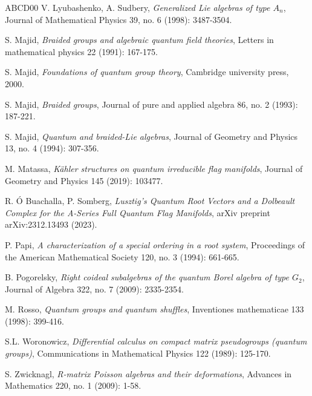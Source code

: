 \documentclass[a4paper, 12pt, reqno, english]{amsart}
\numberwithin{equation}{section}
\numberwithin{figure}{section}
\theoremstyle{plain}
\theoremstyle{plain}
\theoremstyle{plain}
\theoremstyle{plain}
\theoremstyle{plain}
\theoremstyle{definition}
\theoremstyle{definition}
\theoremstyle{definition}
\theoremstyle{remark}
\theoremstyle{definition}
\theoremstyle{definition}
\begin{document}
\begin{thebibliography}{ABCD00}
V. Lyubashenko, A. Sudbery,
\textit{Generalized Lie algebras of type $A_n$},
Journal of Mathematical Physics 39, no. 6 (1998): 3487-3504.

S. Majid,
\textit{Braided groups and algebraic quantum field theories},
Letters in mathematical physics 22 (1991): 167-175.

S. Majid,
\textit{Foundations of quantum group theory},
Cambridge university press, 2000.

S. Majid,
\textit{Braided groups},
Journal of pure and applied algebra 86, no. 2 (1993): 187-221.

S. Majid,
\textit{Quantum and braided-Lie algebras},
Journal of Geometry and Physics 13, no. 4 (1994): 307-356.

M. Matassa,
\textit{Kähler structures on quantum irreducible flag manifolds},
Journal of Geometry and Physics 145 (2019): 103477.

R. Ó Buachalla, P. Somberg,
\textit{Lusztig's Quantum Root Vectors and a Dolbeault Complex for the A-Series Full Quantum Flag Manifolds},
arXiv preprint arXiv:2312.13493 (2023).

P. Papi,
\textit{A characterization of a special ordering in a root system},
Proceedings of the American Mathematical Society 120, no. 3 (1994): 661-665.

B. Pogorelsky,
\textit{Right coideal subalgebras of the quantum Borel algebra of type $G_2$},
Journal of Algebra 322, no. 7 (2009): 2335-2354.

M. Rosso,
\textit{Quantum groups and quantum shuffles},
Inventiones mathematicae 133 (1998): 399-416.

S.L. Woronowicz,
\textit{Differential calculus on compact matrix pseudogroups (quantum groups)},
Communications in Mathematical Physics 122 (1989): 125-170.

S. Zwicknagl,
\textit{R-matrix Poisson algebras and their deformations},
Advances in Mathematics 220, no. 1 (2009): 1-58.

\end{thebibliography}
\end{document}
